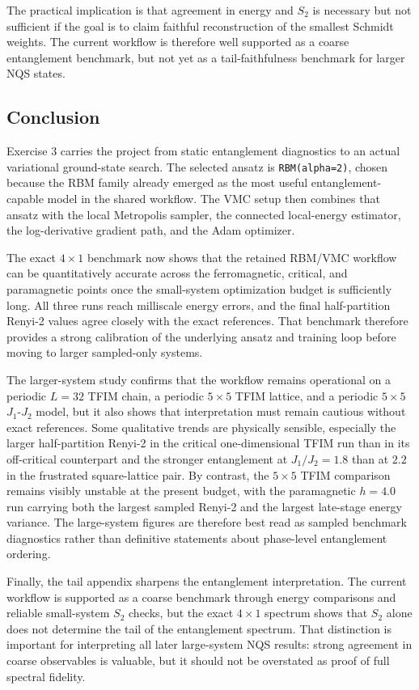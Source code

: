 \documentclass[11pt,a4paper]{article}
\begin{document}
The practical implication is that agreement in energy and $S_2$ is necessary but not sufficient if the goal is to claim faithful reconstruction of the smallest Schmidt weights. The current workflow is therefore well supported as a coarse entanglement benchmark, but not yet as a tail-faithfulness benchmark for larger NQS states.

\subsection*{Conclusion}

Exercise 3 carries the project from static entanglement diagnostics to an actual variational ground-state search. The selected ansatz is \texttt{RBM(alpha=2)}, chosen because the RBM family already emerged as the most useful entanglement-capable model in the shared workflow. The VMC setup then combines that ansatz with the local Metropolis sampler, the connected local-energy estimator, the log-derivative gradient path, and the Adam optimizer.

The exact $4\times 1$ benchmark now shows that the retained RBM/VMC workflow can be quantitatively accurate across the ferromagnetic, critical, and paramagnetic points once the small-system optimization budget is sufficiently long. All three runs reach milliscale energy errors, and the final half-partition Renyi-2 values agree closely with the exact references. That benchmark therefore provides a strong calibration of the underlying ansatz and training loop before moving to larger sampled-only systems.

The larger-system study confirms that the workflow remains operational on a periodic $L=32$ TFIM chain, a periodic $5\times 5$ TFIM lattice, and a periodic $5\times 5$ $J_1$-$J_2$ model, but it also shows that interpretation must remain cautious without exact references. Some qualitative trends are physically sensible, especially the larger half-partition Renyi-2 in the critical one-dimensional TFIM run than in its off-critical counterpart and the stronger entanglement at $J_1/J_2=1.8$ than at $2.2$ in the frustrated square-lattice pair. By contrast, the $5\times 5$ TFIM comparison remains visibly unstable at the present budget, with the paramagnetic $h=4.0$ run carrying both the largest sampled Renyi-2 and the largest late-stage energy variance. The large-system figures are therefore best read as sampled benchmark diagnostics rather than definitive statements about phase-level entanglement ordering.

Finally, the tail appendix sharpens the entanglement interpretation. The current workflow is supported as a coarse benchmark through energy comparisons and reliable small-system $S_2$ checks, but the exact $4\times 1$ spectrum shows that $S_2$ alone does not determine the tail of the entanglement spectrum. That distinction is important for interpreting all later large-system NQS results: strong agreement in coarse observables is valuable, but it should not be overstated as proof of full spectral fidelity.
\end{document}

